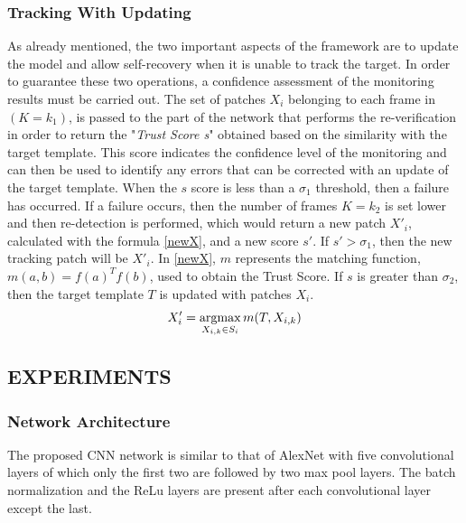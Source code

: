 \subsubsection{Tracking With Updating}
As already mentioned, the two important aspects of the framework are to 
update the model and allow self-recovery when it is unable to track the target. 
In order to guarantee these two operations, a confidence assessment of the 
monitoring results must be carried out. The set of patches $X_i$ belonging to 
each frame in $(K = k_1)$, is passed to the part of the network that performs 
the re-verification in order to return the "\emph{Trust Score s}" obtained based on 
the similarity with the target template. This score indicates the confidence 
level of the monitoring and can then be used to identify any errors that can 
be corrected with an update of the target template. When the $s$ score is less 
than a $\sigma_1$ threshold, then a failure has occurred. If a failure occurs, then the 
number of frames $K = k_2$ is set lower and then re-detection is performed, 
which would return a new patch $X'_i$, calculated with the formula \ref{newX}, and a 
new score $s'$. If $s'> \sigma_1$, then the new tracking patch will be $X'_i$. In \ref{newX}, $m$ 
represents the matching function, $m(a,b)=f(a)^Tf(b)$, used to obtain 
the Trust Score. If $s$ is greater than $\sigma_2$, then the target template $T$ is updated 
with patches $X_i$.
\begin{equation}\label{newX}
    X'_i = \operatorname*{argmax}_{X_{i,k} \in S_i}m(T,X_{i,k})
\end{equation}

\subsection{EXPERIMENTS}
\subsubsection{Network Architecture}
The proposed CNN network is similar to that of AlexNet \cite{0893551108} with five convolutional 
layers of which only the first two are followed by two max pool 
layers. The batch normalization \cite{0893551138} and the ReLu layers are present after 
each convolutional layer except the last.

